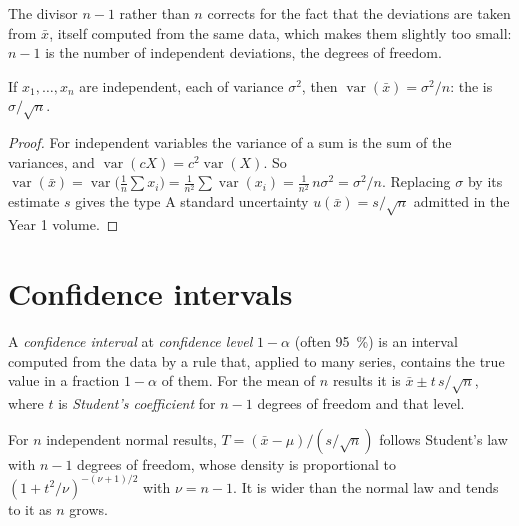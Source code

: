 The divisor $n - 1$ rather than $n$ corrects for the fact that the deviations are taken from $\bar x$,
itself computed from the same data, which makes them slightly too small: $n - 1$ is the number of
independent deviations, the degrees of freedom.

\begin{theorem}\label{thm:b2:measurement-statistics:mean-variance}
If $x_1, \dots, x_n$ are independent, each of variance $\sigma^2$, then $\operatorname{var}(\bar x) =
\sigma^2/n$: the  is $\sigma/\sqrt n$.
\end{theorem}

\begin{proof}
For independent variables the variance of a sum is the sum of the variances, and
$\operatorname{var}(cX) = c^2\operatorname{var}(X)$. So $\operatorname{var}(\bar x) =
\operatorname{var}\bigl(\tfrac1n\sum x_i\bigr) = \tfrac{1}{n^2}\sum\operatorname{var}(x_i) =
\tfrac{1}{n^2}\,n\sigma^2 = \sigma^2/n$. Replacing $\sigma$ by its estimate $s$ gives the type A
standard uncertainty $u(\bar x) = s/\sqrt n$ admitted in the Year 1 volume.
\end{proof}

\section{Confidence intervals}

\begin{definition}\label{def:b2:measurement-statistics:confidence}
A \emph{confidence interval} at \emph{confidence level}
$1 - \alpha$ (often 95~\%) is an interval computed from the data by a rule that, applied to
many series, contains the true value in a fraction $1 - \alpha$ of them. For the mean of $n$ results it
is $\bar x \pm t\,s/\sqrt n$, where $t$ is \emph{Student's coefficient}
for $n - 1$ degrees of freedom and that level.
\end{definition}

\begin{proposition}\label{prop:b2:measurement-statistics:student}
For $n$ independent normal results, $T = (\bar x - \mu)/(s/\sqrt n)$ follows Student's law with
$n - 1$ degrees of freedom, whose density is proportional to $(1 + t^2/\nu)^{-(\nu+1)/2}$ with
$\nu = n - 1$. It is wider than the normal law and tends to it as $n$ grows.
\end{proposition}

